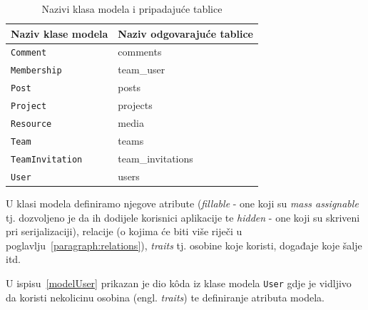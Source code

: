 \begin{longtable}{ll}
\caption{Nazivi klasa modela i pripadajuće tablice}\label{fig:namingModelTable}
\endfirsthead
\endhead
\hline
Naziv klase modela&Naziv odgovarajuće tablice\\
\hline
\lstinline!Comment!&comments\\
\lstinline!Membership!&team\_user\\
\lstinline!Post!&posts\\
\lstinline!Project!&projects\\
\lstinline!Resource!&media\\
\lstinline!Team!&teams\\
\lstinline!TeamInvitation!&team\_invitations\\
\lstinline!User!&users\\
\hline
\end{longtable}

U klasi modela definiramo njegove atribute (\textit{fillable} - one koji su \textit{mass assignable} tj. dozvoljeno je da ih dodijele korisnici aplikacije te \textit{hidden} - one koji su skriveni pri serijalizaciji), relacije (o kojima će biti više riječi u poglavlju~\ref{paragraph:relations}), \textit{traits} tj. osobine koje koristi, događaje koje šalje itd.

U ispisu~\ref{modelUser} prikazan je dio k\^oda iz klase modela \texttt{User} gdje je vidljivo da koristi nekolicinu osobina (engl. \textit{traits}) te definiranje atributa modela.

